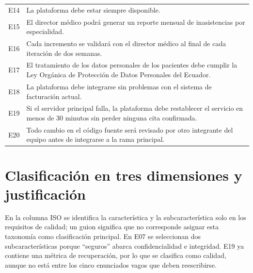 \documentclass[11pt,a4paper]{article}
\begin{document}
{\begin{longtable}{@{}P{1.4cm}P{15.55cm}@{}}
E14 & La plataforma debe estar siempre disponible.\\
E15 & El director médico podrá generar un reporte mensual de inasistencias por especialidad.\\
E16 & Cada incremento se validará con el director médico al final de cada iteración de dos semanas.\\
E17 & El tratamiento de los datos personales de los pacientes debe cumplir la Ley Orgánica de Protección de Datos Personales del Ecuador.\\
E18 & La plataforma debe integrarse sin problemas con el sistema de facturación actual.\\
E19 & Si el servidor principal falla, la plataforma debe restablecer el servicio en menos de 30 minutos sin perder ninguna cita confirmada.\\
E20 & Todo cambio en el código fuente será revisado por otro integrante del equipo antes de integrarse a la rama principal.\\
\end{longtable}
}

\section{Clasificación en tres dimensiones y justificación}
En la columna ISO se identifica la característica y la subcaracterística solo en los requisitos de calidad; un guion significa que no corresponde asignar esta taxonomía como clasificación principal. En E07 se seleccionan dos subcaracterísticas porque ``seguros'' abarca confidencialidad e integridad. E19 ya contiene una métrica de recuperación, por lo que se clasifica como calidad, aunque no está entre los cinco enunciados vagos que deben reescribirse.
\end{document}

